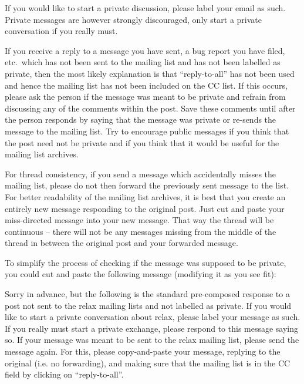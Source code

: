 If you would like to start a private discussion, please label your email as such.  Private messages are however strongly discouraged, only start a private conversation if you really must.

If you receive a reply to a message you have sent, a bug report you have filed, etc.\ which has not been sent to the mailing list and has not been labelled as private, then the most likely explanation is that ``reply-to-all'' has not been used and hence the mailing list has not been included on the CC list.  If this occurs, please ask the person if the message was meant to be private and refrain from discussing any of the comments within the post.  Save these comments until after the person responds by saying that the message was private or re-sends the message to the mailing list.  Try to encourage public messages if you think that the post need not be private and if you think that it would be useful for the mailing list archives.

For thread consistency, if you send a message which accidentally misses the mailing list, please do not then forward the previously sent message to the list.  For better readability of the mailing list archives, it is best that you create an entirely new message responding to the original post.  Just cut and paste your miss-directed message into your new message.  That way the thread will be continuous -- there will not be any messages missing from the middle of the thread in between the original post and your forwarded message.

To simplify the process of checking if the message was supposed to be private, you could cut and paste the following message (modifying it as you see fit):

\begin{exampleenv}
Sorry in advance, but the following is the standard pre-composed response to a post not sent to the relax mailing lists and not labelled as private.  If you would like to start a private conversation about relax, please label your message as such.  If you really must start a private exchange, please respond to this message saying so.  If your message was meant to be sent to the relax mailing list, please send the message again.  For this, please copy-and-paste your message, replying to the original (i.e. no forwarding), and making sure that the mailing list is in the CC field by clicking on ``reply-to-all''.
\end{exampleenv}




